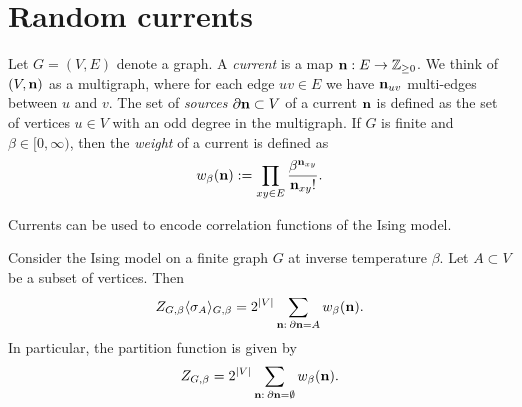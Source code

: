 \section{Random currents}

\begin{definition}[Currents]
    Let $G=(V,E)$ denote a graph.
    A \emph{current} is a map $\mathbf{n}:E\to\mathbb Z_{\geq 0}$.
    We think of $(V,\mathbf{n})$ as a multigraph,
    where for each edge $uv\in E$ we have $\mathbf{n}_{uv}$ multi-edges between $u$ and $v$.
    The set of \emph{sources} $\partial\mathbf{n}\subset V$ of a current
    $\mathbf{n}$ is defined as the set of vertices $u\in V$ with an odd degree in the multigraph.
    If $G$ is finite and $\beta\in[0,\infty)$, then the
    \emph{weight} of a current is defined as
    \[
        w_\beta(\mathbf{n}):=\prod_{xy\in E}
        \frac{\beta^{\mathbf{n}_{xy}}}{\mathbf{n}_{xy}!}.
    \]
\end{definition}

Currents can be used to encode correlation functions of the Ising model.

\begin{theorem}
    Consider the Ising model on a finite graph $G$ at inverse temperature $\beta$.
    Let $A\subset V$ be a subset of vertices.
    Then
    \[
        Z_{G,\beta}\langle\sigma_A\rangle_{G,\beta}
        =2^{|V|}\sum_{\mathbf{n}:\:\partial\mathbf{n}=A}
        w_\beta(\mathbf{n}).
    \]
    In particular, the partition function is given by
    \[
        Z_{G,\beta}=2^{|V|}\sum_{\mathbf{n}:\:\partial\mathbf{n}=\emptyset}
        w_\beta(\mathbf{n}).
    \]
\end{theorem}

